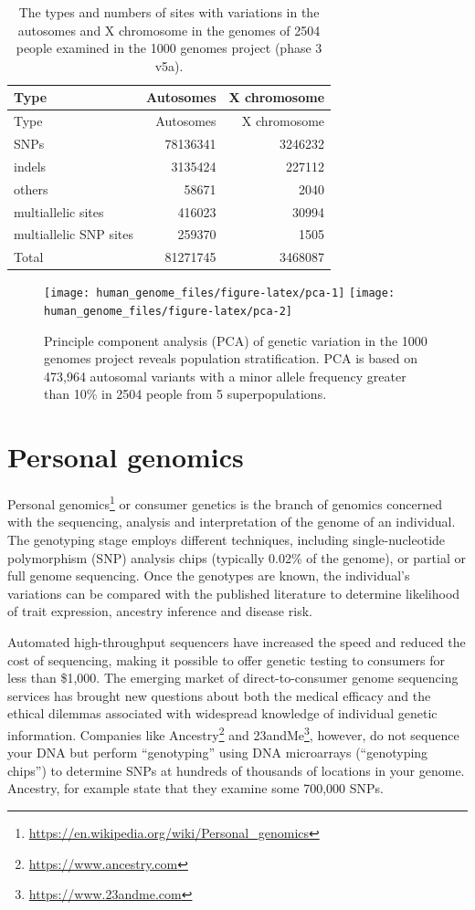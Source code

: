 \documentclass[]{book}
\let\rmarkdownfootnote\footnote%
\def\footnote{\protect\rmarkdownfootnote}
\renewcommand{\href}[2]{#2\footnote{\url{#1}}}
\theoremstyle{definition}
\theoremstyle{definition}
\theoremstyle{definition}
\theoremstyle{remark}
\begin{document}
\begin{longtable}[]{@{}lrr@{}}
\caption{\label{tab:stats} The types and numbers of sites with variations in
the autosomes and X chromosome in the genomes of 2504 people examined in
the 1000 genomes project (phase 3 v5a).}\tabularnewline
\toprule
Type & Autosomes & X chromosome\tabularnewline
\midrule
\endfirsthead
\toprule
Type & Autosomes & X chromosome\tabularnewline
\midrule
\endhead
SNPs & 78136341 & 3246232\tabularnewline
indels & 3135424 & 227112\tabularnewline
others & 58671 & 2040\tabularnewline
multiallelic sites & 416023 & 30994\tabularnewline
multiallelic SNP sites & 259370 & 1505\tabularnewline
Total & 81271745 & 3468087\tabularnewline
\bottomrule
\end{longtable}






\begin{figure}

{\centering \texttt{[image: human\_genome\_files/figure-latex/pca-1]} \texttt{[image: human\_genome\_files/figure-latex/pca-2]} 

}

\caption{Principle component analysis (PCA) of genetic variation in
the 1000 genomes project reveals population stratification. PCA is based
on 473,964 autosomal variants with a minor allele frequency greater than
10\% in 2504 people from 5 superpopulations.}\label{fig:pca}
\end{figure}

\section{Personal genomics}\label{personal-genomics}

\href{https://en.wikipedia.org/wiki/Personal_genomics}{Personal
genomics} or consumer genetics is the branch of genomics concerned with
the sequencing, analysis and interpretation of the genome of an
individual. The genotyping stage employs different techniques, including
single-nucleotide polymorphism (SNP) analysis chips (typically 0.02\% of
the genome), or partial or full genome sequencing. Once the genotypes
are known, the individual's variations can be compared with the
published literature to determine likelihood of trait expression,
ancestry inference and disease risk.

Automated high-throughput sequencers have increased the speed and
reduced the cost of sequencing, making it possible to offer genetic
testing to consumers for less than \$1,000. The emerging market of
direct-to-consumer genome sequencing services has brought new questions
about both the medical efficacy and the ethical dilemmas associated with
widespread knowledge of individual genetic information. Companies like
\href{https://www.ancestry.com}{Ancestry} and
\href{https://www.23andme.com}{23andMe}, however, do not sequence your
DNA but perform ``genotyping'' using DNA microarrays (``genotyping
chips'') to determine SNPs at hundreds of thousands of locations in your
genome. Ancestry, for example state that they examine some 700,000 SNPs.
\end{document}
